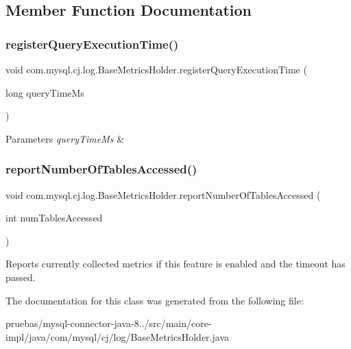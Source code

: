 \subsection{Member Function Documentation}
\mbox{\label{classcom_1_1mysql_1_1cj_1_1log_1_1_base_metrics_holder_a4f2787da929ecc62efd5a93acda4ba58}} 
\subsubsection{\texorpdfstring{register\+Query\+Execution\+Time()}{registerQueryExecutionTime()}}
{\footnotesize\ttfamily void com.\+mysql.\+cj.\+log.\+Base\+Metrics\+Holder.\+register\+Query\+Execution\+Time (\begin{DoxyParamCaption}\item[{long}]{query\+Time\+Ms }\end{DoxyParamCaption})}


\begin{DoxyParams}{Parameters}
{\em query\+Time\+Ms} & \\
\hline
\end{DoxyParams}
\mbox{\label{classcom_1_1mysql_1_1cj_1_1log_1_1_base_metrics_holder_a75061da20b187347e1bd4d07e0c7db34}} 
\subsubsection{\texorpdfstring{report\+Number\+Of\+Tables\+Accessed()}{reportNumberOfTablesAccessed()}}
{\footnotesize\ttfamily void com.\+mysql.\+cj.\+log.\+Base\+Metrics\+Holder.\+report\+Number\+Of\+Tables\+Accessed (\begin{DoxyParamCaption}\item[{int}]{num\+Tables\+Accessed }\end{DoxyParamCaption})}

Reports currently collected metrics if this feature is enabled and the timeout has passed. 

The documentation for this class was generated from the following file\+:\begin{DoxyCompactItemize}
\item 
pruebas/mysql-\/connector-\/java-\/8../src/main/core-\/impl/java/com/mysql/cj/log/Base\+Metrics\+Holder.\+java\end{DoxyCompactItemize}
